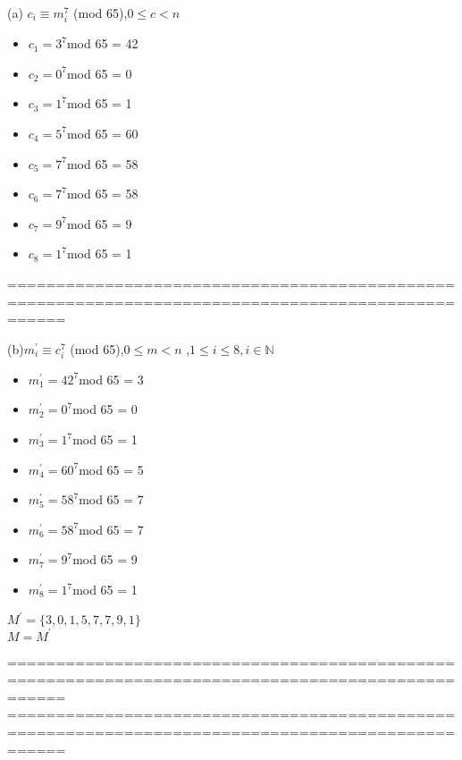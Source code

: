\documentclass[12pt,a4paper]{article}
\begin{document}
(a) $c_i \equiv m_i^7$ (mod 65),$0 \leq c < n $
\begin{itemize}
\item $c_1 = 3^7 $mod 65 = 42
\item $c_2 = 0^7$mod 65 = 0
\item $c_3 = 1^7$mod 65 = 1
\item $c_4 = 5^7$mod 65 = 60
\item $c_5 = 7^7$mod 65 = 58
\item $c_6 = 7^7$mod 65 = 58
\item $c_7 = 9^7$mod 65 = 9
\item $c_8 = 1^7$mod 65 = 1
\end{itemize}


==================================================================================================
\newpage

(b)$m_i^{'} \equiv c_i^7$ (mod 65),$0 \leq m < n $ ,$1 \leq i \leq 8,i \in \mathbb{N}$
\begin{itemize}
\item $m_1^{'} = 42^7 $mod 65 = 3
\item $m_2^{'} = 0^7$mod 65 = 0
\item $m_3^{'} = 1^7$mod 65 = 1
\item $m_4^{'} = 60^7$mod 65 = 5
\item $m_5^{'} = 58^7$mod 65 = 7
\item $m_6^{'}= 58^7$mod 65 = 7
\item $m_7^{'} = 9^7$mod 65 = 9
\item $m_8^{'} = 1^7$mod 65 = 1
\end{itemize}

$M^{'} = \{3,0,1,5,7,7,9,1\}$\\

$M = M^{'}$


==================================================================================================
\newpage
==================================================================================================
\end{document}
